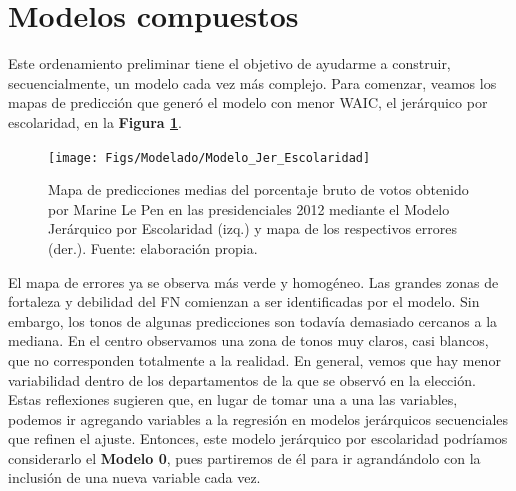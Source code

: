 \section{Modelos compuestos}

Este ordenamiento preliminar tiene el objetivo de ayudarme a construir, secuencialmente, un modelo cada vez más complejo. Para comenzar, veamos los mapas de predicción que generó el modelo con menor WAIC, el jerárquico por escolaridad, en la \textbf{Figura \ref{fig:Modelo_Jer_Escolaridad}}.\\ 

\begin{figure}[h]
	\centering
	\texttt{[image: Figs/Modelado/Modelo\_Jer\_Escolaridad]}
	\caption{Mapa de predicciones medias del porcentaje bruto de votos obtenido por Marine Le Pen en las presidenciales 2012 mediante el Modelo Jerárquico por Escolaridad (izq.) y mapa de los respectivos errores (der.). Fuente: elaboración propia.}
	\label{fig:Modelo_Jer_Escolaridad}
\end{figure}

El mapa de errores ya se observa más verde y homogéneo. Las grandes zonas de fortaleza y debilidad del FN comienzan a ser identificadas por el modelo. Sin embargo, los tonos de algunas predicciones son todavía demasiado cercanos a la mediana. En el centro observamos una zona de tonos muy claros, casi blancos, que no corresponden totalmente a la realidad. En general, vemos que hay menor variabilidad dentro de los departamentos de la que se observó en la elección.\\ 

Estas reflexiones sugieren que, en lugar de tomar una a una las variables, podemos ir agregando variables a la regresión en modelos jerárquicos secuenciales que refinen el ajuste. Entonces, este modelo jerárquico por escolaridad podríamos considerarlo el \textbf{Modelo 0}, pues partiremos de él para ir agrandándolo con la inclusión de una nueva variable cada vez.\\ 

